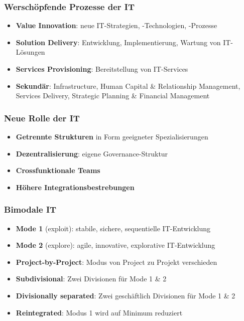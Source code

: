 \documentclass{article}
\begin{document}
\subsubsection{Werschöpfende Prozesse der IT}
\begin{itemize}
  \item \textbf{Value Innovation}: neue IT-Strategien, -Technologien, -Prozesse
  \item \textbf{Solution Delivery}: Entwicklung, Implementierung, Wartung von IT-Lösungen
  \item \textbf{Services Provisioning}: Bereitstellung von IT-Services
  \item \textbf{Sekundär}: Infrastructure, Human Capital \& Relationship Management, Services Delivery, Strategic Planning \& Financial Management
\end{itemize}

\subsubsection{Neue Rolle der IT}
\begin{itemize}
  \item \textbf{Getrennte Strukturen} in Form geeigneter Spezialisierungen
  \item \textbf{Dezentralisierung}: eigene Governance-Struktur
  \item \textbf{Crossfunktionale Teams}
  \item \textbf{Höhere Integrationsbestrebungen}
\end{itemize}

\subsubsection{Bimodale IT}
\begin{itemize}
  \item \textbf{Mode 1} (exploit): stabile, sichere, sequentielle IT-Entwicklung
  \item \textbf{Mode 2} (explore): agile, innovative, explorative IT-Entwicklung
\end{itemize}

\begin{itemize}
  \item \textbf{Project-by-Project}: Modus von Project zu Projekt verschieden
  \item \textbf{Subdivisional}: Zwei Divisionen für Mode 1 \& 2
  \item \textbf{Divisionally separated}: Zwei geschäftlich Divisionen für Mode 1 \& 2
  \item \textbf{Reintegrated}: Modus 1 wird auf Minimum reduziert
\end{itemize}
\end{document}
